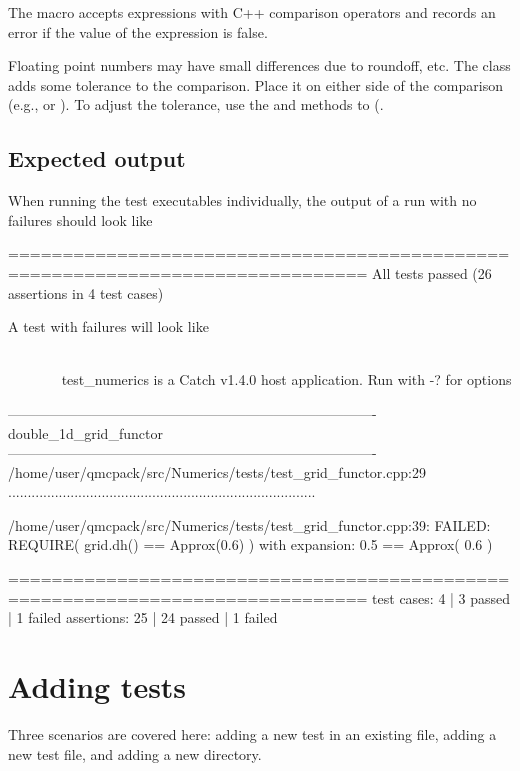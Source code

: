 The  macro accepts expressions with C++ comparison operators and records an error if the value of the expression is false.

Floating point numbers may have small differences due to roundoff, etc.   The  class adds some tolerance to the comparison.  Place it on either side of the comparison (e.g.,  or ).   To adjust the tolerance, use the  and  methods to  (.

\subsection{Expected output}

When running the test executables individually, the output of a run with no failures should look like
\begin{shade}
===============================================================================
All tests passed (26 assertions in 4 test cases)
\end{shade}

A test with failures will look like

\begin{minipage}{\linewidth}
\begin{shade}
~~~~~~~~~~~~~~~~~~~~~~~~~~~~~~~~~~~~~~~~~~~~~~~~~~~~~~~~~~~~~~~~~~~~~~~~~~~~~~~
test_numerics is a Catch v1.4.0 host application.
Run with -? for options

-------------------------------------------------------------------------------
double_1d_grid_functor
-------------------------------------------------------------------------------
/home/user/qmcpack/src/Numerics/tests/test_grid_functor.cpp:29
...............................................................................

/home/user/qmcpack/src/Numerics/tests/test_grid_functor.cpp:39: FAILED:
  REQUIRE( grid.dh() == Approx(0.6) )
with expansion:
  0.5 == Approx( 0.6 )

===============================================================================
test cases:  4 |  3 passed | 1 failed
assertions: 25 | 24 passed | 1 failed
\end{shade}
\end{minipage}


\section{Adding tests}
Three scenarios are covered here: adding a new test in an existing file, adding a new test file, and adding a new  directory.

